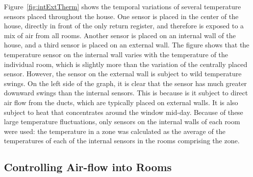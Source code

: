 Figure~\ref{fig:intExtTherm} shows the temporal variations of several
temperature sensors placed throughout the house.  One sensor is placed in the
center of the house, directly in front of the only return register, and
therefore is exposed to a mix of air from all rooms.  Another sensor is placed
on an internal wall of the house, and a third sensor is placed on an external
wall.  The figure shows that the temperature sensor on the internal wall varies
with the temperature of the individual room, which is slightly more than the
variation of the centrally placed sensor.  However, the sensor on the external
wall is subject to wild temperature swings.  On the left side of the graph, it
is clear that the sensor has much greater downward swings than the internal
sensors.  This is because is it subject to direct air flow from the ducts, which
are typically placed on external walls.  It is also subject to heat that
concentrates around the window mid-day.  Because of these large temperature
fluctuations, only sensors on the internal walls of each room were used: the
temperature in a zone was calculated as the average of the temperatures of each
of the internal sensors in the rooms comprising the zone.

\subsection{Controlling Air-flow into Rooms}
\label{subsec:registerLeakage}

\begin{figure}[!htb]
\end{figure}

